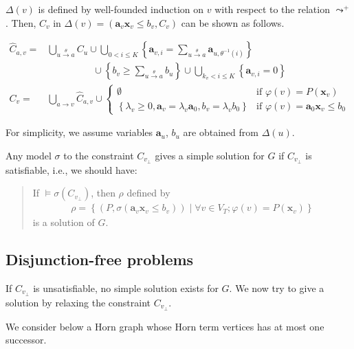 \documentclass[a4paper,12pt]{article}
\newcommand{\edge}[2]{#1\rightarrow#2}
\newcommand{\edgel}[3]{#1\xrightarrow{#2}#3}
\begin{document}
$\Delta(v)$ is defined by well-founded induction on $v$ with respect
to the relation $\leadsto^+$. Then, $C_v$ in
$\Delta(v) = \left( \mathbf{a}_v \mathbf{x}_v \leq b_v, C_v \right)$
can be shown as follows.

\begin{align*}
\hat C_{a,v} = &
 \bigcup_{\edgel{u}{\theta}{a}} C_u \cup
 \bigcup_{0 < i \leq K}
 \left\lbrace
  \mathbf{a}_{v,i} = \sum_{\edgel{u}{\theta}{a}} \mathbf{a}_{u, \theta^{-1} (i)}
 \right\rbrace \\
 & \hspace{2cm} \cup
 \left\lbrace
  b_v \geq \sum_{\edgel{u}{\theta}{a}} b_u
 \right\rbrace \cup
 \bigcup_{k_v < i \leq K}
 \left\lbrace \mathbf{a}_{v,i} = 0 \right\rbrace
\\
C_v = & \bigcup_{\edge{a}{v}} \hat C_{a,v} \cup
\begin{cases}
\emptyset
& \mbox{if } \varphi(v) = P(\mathbf{x}_v) \\
\left\lbrace
 \lambda_v \geq 0, \mathbf{a}_v = \lambda_v \mathbf{a}_0,
 b_v = \lambda_v b_0
\right\rbrace
& \mbox{if } \varphi(v) = \mathbf{a}_0 \mathbf{x}_v \leq b_0
\end{cases}
\end{align*}

For simplicity, we assume variables $\mathbf{a}_u$, $b_u$ are obtained
from $\Delta(u)$.

Any model $\sigma$ to the constraint $C_{v_\bot}$ gives a simple
solution for $G$ if $C_{v_\bot}$ is satisfiable, i.e., we should have:

\begin{quote}
If $\models \sigma(C_{v_\bot})$, then $\rho$ defined by
\begin{align*}
 \rho = \left\lbrace
  \left( P, \sigma(\mathbf{a}_v \mathbf{x}_v \leq b_v) \right) \middle|
  \forall v \in V_T; \varphi(v) = P(\mathbf{x}_v)
 \right\rbrace
\end{align*}
is a solution of $G$.
\end{quote}

\subsection{Disjunction-free problems}

If $C_{v_\bot}$ is unsatisfiable, no simple solution exists for
$G$. We now try to give a solution by relaxing the constraint
$C_{v_\bot}$.

We consider below a Horn graph whose Horn term vertices has at
most one successor.
\end{document}
